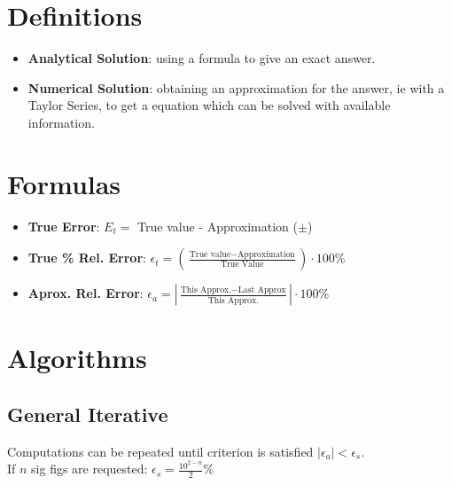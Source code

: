 \documentclass[fontsize=9pt]{scrartcl}
\begin{document}
\begin{multicols}{3}
  \section{Definitions}
    \begin{itemize}
      \item \textbf{Analytical Solution}: using a formula to give an exact answer.
      \item \textbf{Numerical Solution}: obtaining an approximation for the answer, 
            ie with a Taylor Series, to get a equation which can be solved with available
            information.
    \end{itemize}

  \section{Formulas}
      \begin{itemize}
        \item \textbf{True Error}: $E_t =$ True value - Approximation ($\pm$)
        \item \textbf{True \% Rel. Error}: $\epsilon_t = (\frac{\text{True value} - \text{Approximation}}{\text{True Value}})\cdot100\%$
        \item \textbf{Aprox. Rel. Error}: $\epsilon_a =  |\frac{\text{This Approx.} - \text{Last Approx}}{\text{This Approx.}}|\cdot100\%$
      \end{itemize}
      
  \section{Algorithms}
    \subsection{General Iterative}
      Computations can be repeated until criterion is satisfied $|\epsilon_a| < \epsilon_s$. \\
      If $n$ sig figs are requested: $\epsilon_s = \frac{10^{2-n}}{2}\%$ \\

\end{multicols}
\end{document}
